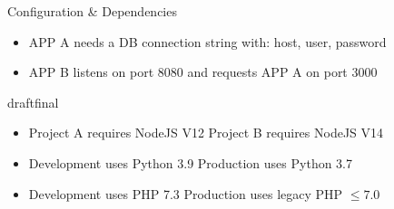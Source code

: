 \documentclass{beamer}
\def\final{final}
\def\status{draft}
\begin{document}
\begin{frame}{}
  \vspace{-.6cm}
  \begin{center}
    \Large Configuration \& Dependencies
  \end{center}

  \begin{block}{}
    \begin{itemize}
      \small
      \setlength\itemsep{0em}
      \item APP A needs a DB connection string with: host, user, password
      \item APP B listens on port 8080 and requests APP A on port 3000
    \end{itemize}
  \end{block}

  \ifx\status\final{}
    \pause{}
  \fi

  \begin{block}{}
    \begin{itemize}
      \small
      \setlength\itemsep{0em}
      \item Project A requires NodeJS V12 {\color{uos-red-full}\text{\marvosymLightning}} Project B requires NodeJS V14
      \item Development uses Python 3.9 {\color{uos-red-full}\text{\marvosymLightning}} Production uses Python 3.7
      \item Development uses PHP 7.3 {\color{uos-red-full}\text{\marvosymLightning}} Production uses legacy PHP \(\leq 7.0\)
    \end{itemize}
  \end{block}
\end{frame}

\end{document}
